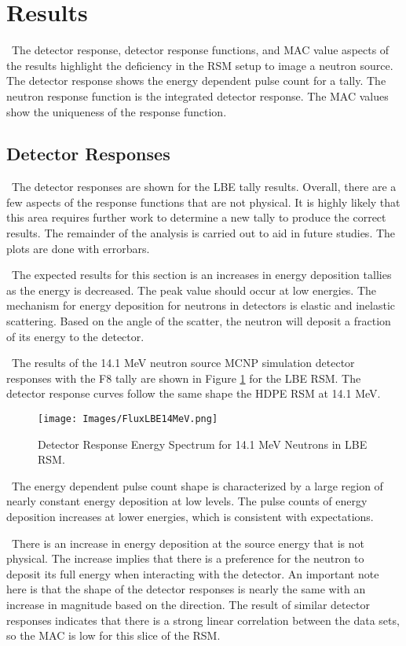 \documentclass[journal]{IEEEtran}
\let\MYoriglatexcaption\caption
\renewcommand{\caption}[2][\relax]{\MYoriglatexcaption[#2]{#2}}
\begin{document}
	\section{Results}
    \ The detector response, detector response functions, and MAC value aspects of the results highlight the deficiency in the RSM setup to image a neutron source.  The detector response shows the energy dependent pulse count for a tally.  The neutron response function is the integrated detector response.  The MAC values show the uniqueness of the response function. 
      
	\subsection{Detector Responses}
    \ The detector responses are shown for the LBE tally results.  Overall, there are a few aspects of the response functions that are not physical.  It is highly likely that this area requires further work to determine a new tally to produce the correct results.  The remainder of the analysis is carried out to aid in future studies.  The plots are done with errorbars. 
    
    \ The expected results for this section is an increases in energy deposition tallies as the energy is decreased.  The peak value should occur at low energies.  The mechanism for energy deposition for neutrons in detectors is elastic and inelastic scattering.  Based on the angle of the scatter, the neutron will deposit a fraction of its energy to the detector.  
    
    \ The results of the 14.1 MeV neutron source MCNP simulation detector responses with the F8 tally are shown in Figure \ref{fig:ESpec} for the LBE RSM. The detector response curves follow the same shape the HDPE RSM at 14.1 MeV.  
	
	\begin{figure}[ht]
		\texttt{[image: Images/FluxLBE14MeV.png]}
		\centering
		\caption{Detector Response Energy Spectrum for 14.1 MeV Neutrons in LBE RSM.}
		\label{fig:ESpec}
	\end{figure}
	
	\ The energy dependent pulse count shape is characterized by a large region of nearly constant energy deposition at low levels.  The pulse counts of energy deposition increases at lower energies, which is consistent with expectations. 
	
	\ There is an increase in energy deposition at the source energy that is not physical.  The increase implies that there is a preference for the neutron to deposit its full energy when interacting with the detector.  An important note here is that the shape of the detector responses is nearly the same with an increase in magnitude based on the direction.  The result of similar detector responses indicates that there is a strong linear correlation between the data sets, so the MAC is low for this slice of the RSM. 
	
\end{document}
